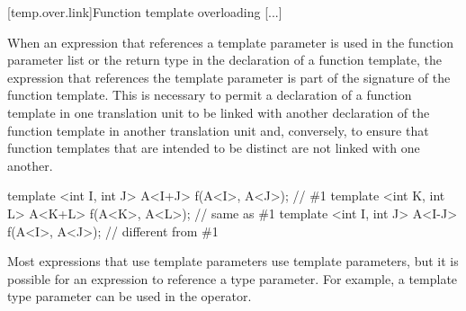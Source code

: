 \documentclass{wg21}
\begin{document}
%

[temp.over.link]{Function template overloading}
\textcolor{noteclr}{[...]}

\pnum
When an expression that references a template parameter is used in the
function parameter list or the return type in the declaration of a
function template, the expression that references the template
parameter is part of the signature of the function template.
This is
necessary to permit a declaration of a function template in one
translation unit to be linked with another declaration of the function
template in another translation unit and, conversely, to ensure that
function templates that are intended to be distinct are not linked
with one another.
\begin{example}
    \begin{codeblock}
        template <int I, int J> A<I+J> f(A<I>, A<J>);   // \#1
        template <int K, int L> A<K+L> f(A<K>, A<L>);   // same as \#1
        template <int I, int J> A<I-J> f(A<I>, A<J>);   // different from \#1
    \end{codeblock}
\end{example}
\begin{note}
    Most expressions that use template parameters use  template
    parameters, but it is possible for an expression to reference a type
    parameter.
    For example, a template type parameter can be used in the
     operator.
\end{note}
\end{document}
